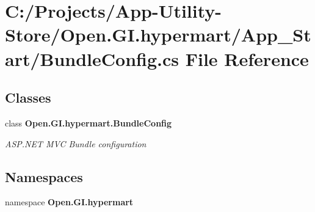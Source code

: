 \section{C\+:/\+Projects/\+App-\/\+Utility-\/\+Store/\+Open.G\+I.\+hypermart/\+App\+\_\+\+Start/\+Bundle\+Config.cs File Reference}
\label{_bundle_config_8cs}
\subsection*{Classes}
\begin{DoxyCompactItemize}
\item 
class \textbf{ Open.\+G\+I.\+hypermart.\+Bundle\+Config}
\begin{DoxyCompactList}\small\item\em A\+S\+P.\+N\+ET M\+VC Bundle configuration \end{DoxyCompactList}\end{DoxyCompactItemize}
\subsection*{Namespaces}
\begin{DoxyCompactItemize}
\item 
namespace \textbf{ Open.\+G\+I.\+hypermart}
\end{DoxyCompactItemize}
